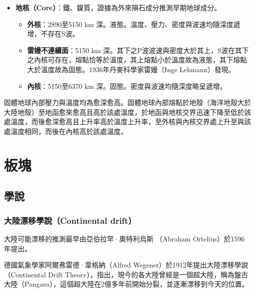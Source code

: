\documentclass[a4paper,12pt]{report}
\begin{document}
\begin{itemize}
\bct\bfH\ctr{}\ef\FB\ect
\item \textbf{地核（Core）}：鐵、鎳質，證據為外來隕石成分推測早期地球成分。
\begin{itemize}
\item \textbf{外核}：2890至5150 km 深。液態。溫度、壓力、密度與波速均隨深度遞增，不存在S波。
\item \textbf{雷嫚不連續面}：5150 km 深。其下之P波波速與密度大於其上，S波在其下之內核可存在，熔點恰等於溫度，其上熔點小於溫度故為液態，其下熔點大於溫度故為固態。1936年丹麥科學家雷嫚（Inge Lehmann）發現。
\item \textbf{內核}：5150至6370 km 深。固態。密度與波速均隨深度略呈遞增。
\end{itemize}
\end{itemize}
固體地球內部壓力與溫度均為愈深愈高。固體地球內部熔點於地殼（海洋地殼大於大陸地殼）至地函愈來愈高且高於該處溫度，於地函與地核交界迅速下降至低於該處溫度，而後愈深愈高且上升率高於溫度上升率，至外核與內核交界處上升至與該處溫度相同，而後在內核高於該處溫度。
\bct\bfH\ctr{}\caption{Karla Panchuk, modified after Steven Earle (2016)}\ef\FB\ect
\section{板塊}
\subsection{學說}
\subsubsection{大陸漂移學說（Continental drift）}
大陸可能漂移的推測最早由亞伯拉罕·奧特利烏斯 （Abraham Ortelius）於1596年提出。

德國氣象學家阿爾弗雷德·韋格納（Alfred Wegener）於1912年提出大陸漂移學說（Continental Drift Theory），指出，現今的各大陸曾經是一個超大陸，稱為盤古大陸（Pangaea），這個超大陸在2億多年前開始分裂，並逐漸漂移到今天的位置。
\end{document}
